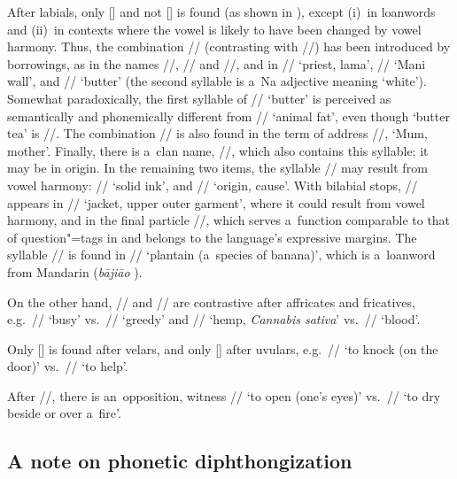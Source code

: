 			After labials, only [] and not [] is found (as shown in ), except (i)~in loanwords and (ii)~in contexts where the vowel is likely to have been changed by vowel harmony. Thus, the combination //
			(contrasting with //) has been introduced by  borrowings, as in the names
			//, /{\kern1pt}/ and //, and in // ‘priest, lama’,
			// ‘Mani wall’, and //
			‘butter’ (the second syllable is a~Na adjective meaning ‘white’). Somewhat paradoxically, the first
			syllable of //
			‘butter’ is perceived as semantically and phonemically different from //
			‘animal fat’, even though ‘butter tea’ is //. The combination // is also found
			in the term of address //, ‘Mum, mother’. Finally, there is a~clan name,
			//, which also contains this syllable; it may be  in origin. In the remaining two items, the syllable // may result from vowel harmony:
			// ‘solid ink’, and // ‘origin, cause’. With bilabial stops, // appears in // ‘jacket, upper outer garment’, where it could result from vowel harmony, and in the final particle //, which serves a~function comparable to that of {question}"=tags in  and belongs to the language's expressive margins. The syllable // is found in // ‘plantain (a~species of banana)’, which is a~loanword from {Mandarin} (\textit{bājiāo} ).
			
			On the other hand, // and // are contrastive after affricates and fricatives,
			e.g.~// ‘busy’ vs.\ // ‘greedy’ and // ‘hemp, \textit{Cannabis sativa}’
			vs.\ // ‘blood’.
			
			Only  [] is found after velars, and only  [] after uvulars, e.g.~// ‘to knock (on the door)’ vs.\ // ‘to help’.
			
			After //, there is an~opposition, witness //
			‘to open (one’s eyes)’ vs.\ // ‘to dry beside or over a~fire’.
			
			
			
			\subsection{A note on phonetic diphthongization}
			\label{sec:diphthongization}
			
